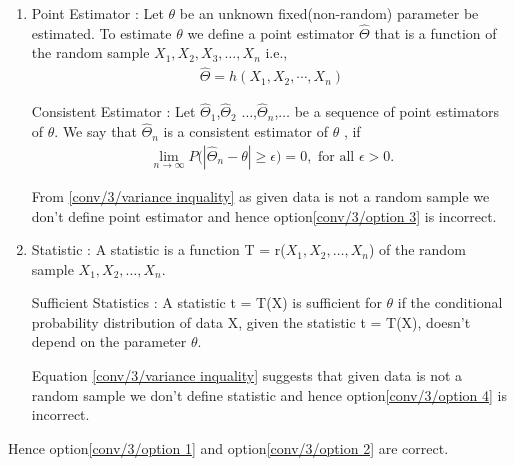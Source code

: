 \begin{enumerate}
   \item
   \begin{definition}
   
     Point Estimator : Let $\theta$ be an unknown fixed(non-random) parameter be estimated. To estimate $\theta$ we define a point estimator $\hat{\Theta}$ that is a function of the random sample  $X_{1},X_{2},X_{3},\dots,X_{n}$ i.e.,
     \begin{align}
       \hat{\Theta}=h(X_1,X_2,\cdots,X_n)
   \end{align}
   
   \end{definition}
   
   \begin{definition}
     Consistent Estimator : Let $\hat{\Theta}_1$,$\hat{\Theta}_2$ $\dots$,$\hat{\Theta}_n$,$\dots$ be a sequence of point estimators of $\theta$. We say that $\hat{\Theta}_n$ is a consistent estimator of $\theta$ , if 
   \begin{align} \label{conv/3/consistent estimator definition}
       \lim_{n \rightarrow \infty} P\big(|\hat{\Theta}_n-\theta| \geq \epsilon \big)=0, \textrm{ for all }\epsilon>0.
   \end{align}
   \end{definition}
  
   From \eqref{conv/3/variance inquality} as given data is not a random sample we don't define point estimator and hence option\eqref{conv/3/option 3} is incorrect.
   
   \item
   \begin{definition}
     Statistic : A statistic is a function T = r($X_{1},X_{2},\dots,X_{n}$) of the random sample $X_{1},X_{2},\dots,X_{n}$.
   \end{definition}
   \begin{definition}
    Sufficient Statistics : A statistic t = T(X) is sufficient for $\theta$ if the conditional probability distribution of data X, given the statistic t = T(X), doesn't depend on the parameter $\theta$.
   \end{definition}
   Equation \eqref{conv/3/variance inquality} suggests that given data is not a random sample we don't define statistic and hence option\eqref{conv/3/option 4} is incorrect.
\end{enumerate}
Hence option\eqref{conv/3/option 1} and option\eqref{conv/3/option 2} are correct.